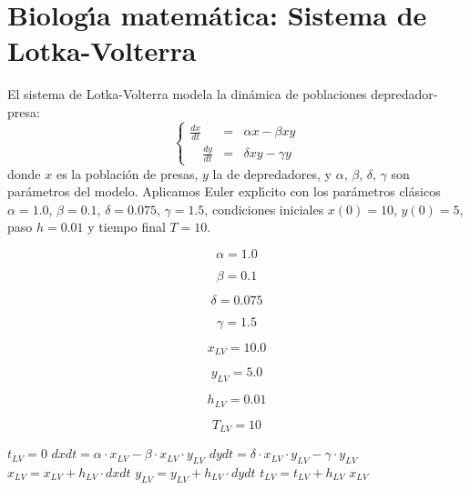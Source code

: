 \documentclass{article}
\begin{document}
\section{Biolog\'{\i}a matem\'atica: Sistema de Lotka-Volterra}

El sistema de Lotka-Volterra modela la din\'amica de poblaciones depredador-presa:
\[
\left \{
\begin{array}{rrrr}
    \frac{dx}{dt} & = &\alpha x - \beta x y \\
    \quad \frac{dy}{dt} & = &\delta x y - \gamma y
\end{array}
\right .
\]
donde $x$ es la poblaci\'on de presas, $y$ la de depredadores, y $\alpha$, $\beta$,
$\delta$, $\gamma$ son par\'ametros del modelo. Aplicamos Euler expl\'{\i}cito con los
par\'ametros cl\'asicos $\alpha = 1.0$, $\beta = 0.1$, $\delta = 0.075$, $\gamma = 1.5$,
condiciones iniciales $x(0) = 10$, $y(0) = 5$, paso $h = 0.01$ y tiempo final $T = 10$.

\begin{equation}
    \alpha = 1.0
    \label{eq:calc:alpha}
\end{equation}

\begin{equation}
    \beta = 0.1
    \label{eq:calc:beta}
\end{equation}

\begin{equation}
    \delta = 0.075
    \label{eq:calc:delta}
\end{equation}

\begin{equation}
    \gamma = 1.5
    \label{eq:calc:gamma}
\end{equation}

\begin{equation}
    x_{LV} = 10.0
    \label{eq:calc:xlv}
\end{equation}

\begin{equation}
    y_{LV} = 5.0
    \label{eq:calc:ylv}
\end{equation}

\begin{equation}
    h_{LV} = 0.01
    \label{eq:calc:hlv}
\end{equation}

\begin{equation}
    T_{LV} = 10
    \label{eq:calc:Tlv}
\end{equation}

\begin{algorithm}
\caption{Euler expl\'{\i}cito para el sistema de Lotka-Volterra}
\label{alg:calc:xlv}
\begin{algorithmic}
    \STATE $t_{LV} = 0$
        \STATE $dxdt = \alpha \cdot x_{LV} - \beta \cdot x_{LV} \cdot y_{LV}$
        \STATE $dydt = \delta \cdot x_{LV} \cdot y_{LV} - \gamma \cdot y_{LV}$
        \STATE $x_{LV} = x_{LV} + h_{LV} \cdot dxdt$
        \STATE $y_{LV} = y_{LV} + h_{LV} \cdot dydt$
        \STATE $t_{LV} = t_{LV} + h_{LV}$
    \ENDWHILE
    \RETURN $x_{LV}$
\end{algorithmic}
\end{algorithm}
\end{document}
